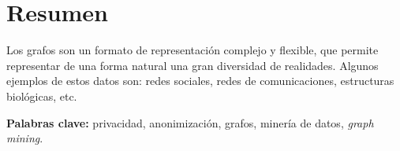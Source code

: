 \setcounter{page}{1} 
\pagestyle{plain}

\chapter*{Resumen}

\onehalfspacing

Los grafos son un formato de representación complejo y flexible, que permite representar de una forma natural una gran diversidad de realidades. Algunos ejemplos de estos datos son: redes sociales, redes de comunicaciones, estructuras biológicas, etc.


\vspace*{1cm}

\textbf{Palabras clave:} privacidad, anonimización, grafos, minería de datos, \emph{graph mining}.
